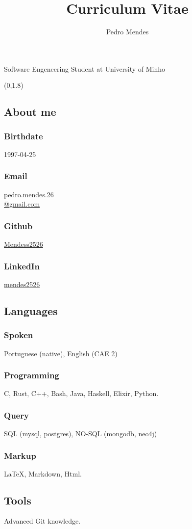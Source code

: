 \documentclass{article}
\renewcommand{\maketitle}{
    \begin{center}
        {\huge\bfseries\theauthor}

        \vspace{.25em}

        \Large{Software Engeneering Student at University of Minho}

        \vspace{.25em}

        \large{\thetitle}
    \end{center}
}
\begin{document}
\title{Curriculum Vitae}
\author{Pedro Mendes}

\maketitle

\begin{textblock}{2}(0,1.8)
    \begin{flushright}
        \subsection{\hfill About me}
        \subsubsection{\hfill Birthdate}
        1997-04-25
        \subsubsection{\hfill Email}
        \href{mailto:pedro.mendes.26@gmail.com}{pedro.mendes.26\\@gmail.com}
        \subsubsection{\hfill Github}
        \href{https://github.com/Mendess2526}{Mendess2526}
        \subsubsection{\hfill LinkedIn}
        \href{https://www.linkedin.com/in/mendes2526/}{mendes2526}

        \subsection{\hfill Languages}
        \subsubsection{\hfill Spoken}
        Portuguese (native), English (CAE 2)
        \subsubsection{\hfill Programming}
        C, Rust, C++, Bash, Java, Haskell, Elixir, Python.
        \subsubsection{\hfill Query}
        SQL (mysql, postgres), NO-SQL (mongodb, neo4j)
        \subsubsection{\hfill Markup}
        \LaTeX, Markdown, Html.
        \subsection{\hfill Tools}
        Advanced Git knowledge.
    \end{flushright}
\end{textblock}
\end{document}
